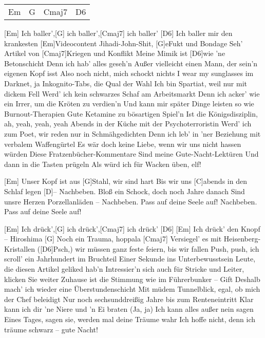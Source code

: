 

\begin{guitar}
	{\footnotesize\begin{tabular}{|l|l|l|l|}
			Em & G & Cmaj7 & D6
	\end{tabular}}

	[Em] Ich baller',[G] ich baller',[Cmaj7] ich baller' [D6]{}
	Ich baller mir den krankesten [Em]Videocontent
	Jihadi-John-Shit, [G]eFukt und Bondage
	Seh' Artikel von [Cmaj7]Kriegen und Konflikt
	Meine Mimik ist [D6]wie 'ne Betonschicht
	Denn ich hab' alles geseh'n
	Außer vielleicht einen Mann, der sein'n eigenen Kopf isst
	Also noch nicht, mich schockt nichts
	I wear my sunglasses im Darknet, ja
	Inkognito-Tabs, die Qual der Wahl
	Ich bin Spartiat, weil nur mit dickem Fell
	Werd' ich kein schwarzes Schaf am Arbeitsmarkt
	Denn ich acker' wie ein Irrer, um die Kröten zu verdien'n
	Und kann mir später Dinge leisten so wie Burnout-Therapien
	Gute Ketamine zu bösartigen Spiel'n
	Ist die Königsdisziplin, ah, yeah, yeah, yeah
	Abends in der Küche mit der Psychoterroristin
	Werd' ich zum Poet, wir reden nur in Schmähgedichten
	Denn ich leb' in 'ner Beziehung mit verbalem Waffengürtel
	Es wär doch keine Liebe, wenn wir uns nicht hassen würden
	Diese Fratzenbücher-Kommentare
	Sind meine Gute-Nacht-Lektüren
	Und dann in die Tasten prügeln
	Als würd ich für Wacken üben, elf!
	
	\begin{highlightbar}
		[Em] Unser Kopf ist aus [G]Stahl, wir sind hart
		Bis wir uns [C]abends in den Schlaf legen [D]{–} Nachbeben.
		Bloß ein Schock, doch noch Jahre danach
		Sind unsre Herzen Porzellanläden – Nachbeben.
		Pass auf deine Seele auf! Nachbeben.
		Pass auf deine Seele auf!
	\end{highlightbar}
	
	[Em] Ich drück',[G] ich drück',[Cmaj7] ich drück' [D6]{}
	[Em] Ich drück' den Knopf – Hiroshima
	[G] Noch ein Trauma, hoppala
	[Cmaj7] Versiegel' es mit Heisenberg-Kristallen
	([D6]Psch,) wir müssen ganz feste feiern, bis wir fallen
	Push, push, ich scroll' ein Jahrhundert im Bruchteil
	Einer Sekunde ins Unterbewusstsein
	Leute, die diesen Artikel geliked hab'n
	Intressier'n sich auch für Stricke und Leiter, klicken Sie weiter
	Zuhause ist die Stimmung wie im Führerbunker – Gift
	Deshalb mach' ich wieder eine Überstundenschicht
	Mit müdem Tunnelblick, egal, ob mich der Chef beleidigt
	Nur noch sechsunddreißig Jahre bis zum Renteneintritt
	Klar kann ich dir 'ne Niere und 'n Ei braten (Ja, ja)
	Ich kann alles außer nein sagen
	Eines Tages, sagen sie, werden mal deine Träume wahr
	Ich hoffe nicht, denn ich träume schwarz – gute Nacht!
	

\end{guitar}
